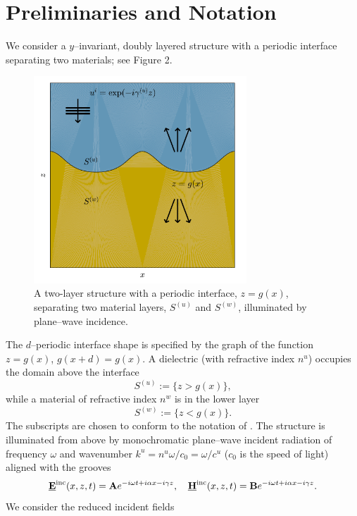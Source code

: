 \section{Preliminaries and Notation}
\label{intro:preliminaries_notation
}

We consider a $y$--invariant, doubly layered structure
with a periodic interface separating two materials; see Figure 2.
\vspace{-14mm}
%
%
\begin{figure}[H]
\begin{center}
\includegraphics[width=80mm]{figures/two_layer_interface.png}
\caption{A two-layer structure with a periodic interface,
    $z=g(x)$, separating two material layers, $S^{(u)}$ and
    $S^{(w)}$, illuminated by plane--wave incidence.}
\end{center}
\end{figure}
\vspace{-22mm}
The $d$--periodic interface shape is specified by the graph of the function
$z = g(x)$, $g(x+d) = g(x)$. A dielectric (with refractive index $n^u$) 
occupies the domain above the interface
$$
S^{(u)} := \{ z > g(x) \},
$$
while a material of refractive index $n^w$ is in the lower layer
$$
S^{(w)} := \{ z < g(x) \}.
$$
The subscripts are chosen to conform to the notation of
\cite{Nicholls12,Nicholls17}.
The structure is illuminated from above by monochromatic plane--wave incident radiation
of frequency $\omega$ and wavenumber $k^u = n^u\omega/c_0=\omega/c^u$ 
($c_0$ is the speed of light) aligned with the grooves
$$
\textbf{\underline{E}}^{\text{inc}}(x,z,t) = \textbf{A} e^{-i \omega t + i \alpha x - i \gamma z},
\quad
\textbf{\underline{H}}^{\text{inc}}(x,z,t) = \textbf{B} e^{-i \omega t + i \alpha x - i \gamma z}.
$$
We consider the reduced incident fields

